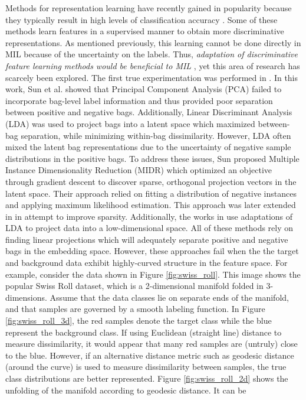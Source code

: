 Methods for representation learning have recently gained in popularity because they typically result in high levels of classification accuracy \citep{Bengio2014RepLearningReview}.  Some of these methods  learn features in a supervised manner to obtain more discriminative representations.  As mentioned previously, this learning cannot be done directly in  MIL because of the uncertainty on the labels.  Thus, \textit{adaptation of discriminative  feature learning methods would be beneficial to MIL} \citep{Carbonneau2016MILSurvey}, yet this area of research has scarcely been explored.  The first true experimentation was performed in \citep{Sun2010MIDR}.  In this work, Sun et al. showed that Principal Component Analysis (PCA) failed to incorporate bag-level label information and thus provided poor separation between positive and negative bags.  Additionally, Linear Discriminant Analysis (LDA) was used to project bags into a latent space which maximized between-bag separation, while minimizing within-bag dissimilarity.  However, LDA often mixed the latent bag representations due to the uncertainty of negative sample distributions in the positive bags.  To address these issues, Sun proposed Multiple Instance Dimensionality Reduction (MIDR) which optimized an objective through gradient descent to discover sparse, orthogonal projection vectors in the latent space.  Their approach relied on fitting a distribution of negative instances and applying maximum likelihood estimation.  This approach was later extended in \citep{Zhu2018MIDRSparsity} in attempt to improve sparsity.  Additionally, the works in \citep{Ping2010MILDRMaxMargin,Kim2010LocalDRMIL,Chai2014MIDA} use adaptations of LDA to project data into a low-dimensional space. All of these methods rely on finding linear projections which will adequately separate positive and negative bags in the embedding space.  However, these approaches fail when the the target and background data exhibit highly-curved structure in the feature space.  For example, consider the data shown in Figure \ref{fig:swiss_roll}.  This image shows the popular Swiss Roll dataset, which is a 2-dimensional manifold folded in 3-dimensions.  Assume that the data classes lie on separate ends of the manifold, and that samples are governed by a smooth labeling function.  In Figure \ref{fig:swiss_roll_3d}, the red samples denote the target class while the blue represent the background class.  If using Euclidean (straight line) distance to measure dissimilarity, it would appear that many red samples are (untruly) close to the blue.  However, if an alternative distance metric such as geodesic distance (around the curve) is used to measure dissimilarity between samples, the true class distributions are better represented.  Figure \ref{fig:swiss_roll_2d} shows the unfolding of the manifold according to geodesic distance.  It can be 